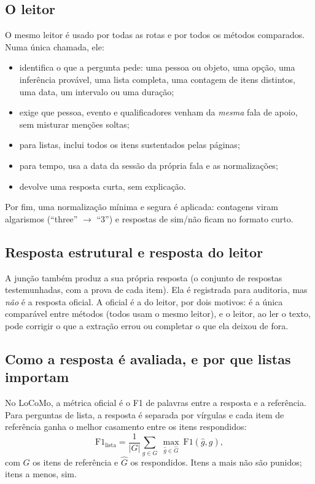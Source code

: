 \documentclass[11pt]{article}
\begin{document}
\subsection{O leitor}

O mesmo leitor é usado por todas as rotas e por todos os métodos comparados.
Numa única chamada, ele:
\begin{itemize}[nosep]
\item identifica o que a pergunta pede: uma pessoa ou objeto, uma opção, uma
inferência provável, uma lista completa, uma contagem de itens distintos,
uma data, um intervalo ou uma duração;
\item exige que pessoa, evento e qualificadores venham da \emph{mesma} fala
de apoio, sem misturar menções soltas;
\item para listas, inclui todos os itens sustentados pelas páginas;
\item para tempo, usa a data da sessão da própria fala e as normalizações;
\item devolve uma resposta curta, sem explicação.
\end{itemize}
Por fim, uma normalização mínima e segura é aplicada: contagens viram
algarismos (``three'' $\to$ ``3'') e respostas de sim/não ficam no formato
curto.

\subsection{Resposta estrutural e resposta do leitor}

A junção também produz a sua própria resposta (o conjunto de respostas
testemunhadas, com a prova de cada item). Ela é registrada para auditoria,
mas \emph{não} é a resposta oficial. A oficial é a do leitor, por dois
motivos: é a única comparável entre métodos (todos usam o mesmo leitor), e o
leitor, ao ler o texto, pode corrigir o que a extração errou ou completar o
que ela deixou de fora.

\subsection{Como a resposta é avaliada, e por que listas importam}

No LoCoMo, a métrica oficial é o F1 de palavras entre a resposta e a
referência. Para perguntas de lista, a resposta é separada por vírgulas e cada
item de referência ganha o melhor casamento entre os itens respondidos:
\[
\mathrm{F1}_{\text{lista}}=\frac{1}{|G|}\sum_{g\in G}\ \max_{\hat g\in\hat G}\ \mathrm{F1}(\hat g,g),
\]
com $G$ os itens de referência e $\hat G$ os respondidos. Itens a mais não são
punidos; itens a menos, sim.
\end{document}
